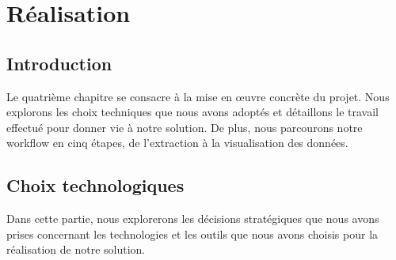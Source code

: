 \chapter{Réalisation}
	
\section*{Introduction}
    Le quatrième chapitre se consacre à la mise en œuvre concrète du projet. Nous explorons les choix techniques que nous avons adoptés et détaillons le travail effectué pour donner vie à notre solution. De plus, nous parcourons notre workflow en cinq étapes, de l'extraction à la visualisation des données.

\section{Choix technologiques}
\par  Dans cette partie, nous explorerons les décisions stratégiques que nous avons prises concernant les technologies et les outils que nous avons choisis pour la réalisation de notre solution.     
